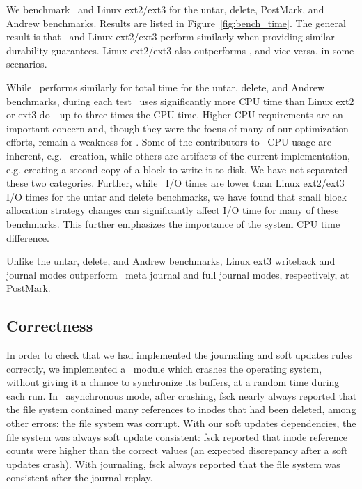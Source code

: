We benchmark \Kudos\ and Linux ext2/ext3 for the untar, delete,
PostMark, and Andrew benchmarks. Results are listed in
Figure~\ref{fig:bench_time}.
%
The general result is that \Kudos\ and Linux ext2/ext3 perform
similarly when providing similar durability guarantees. Linux
ext2/ext3 also outperforms \Kudos, and vice versa, in some scenarios.

\benchtable{}

While \Kudos\ performs similarly for total time for the untar, delete,
and Andrew benchmarks, during each test \Kudos\ uses significantly
more CPU time than Linux ext2 or ext3 do---up to three times the CPU
time.
%
Higher CPU requirements are an important concern and, though they were
the focus of many of our optimization efforts, remain a weakness
for \Kudos.
%
Some of the contributors to \Kudos\ CPU usage are inherent, e.g.
\patch\ creation, while others are artifacts of the current
implementation, e.g.  creating a second copy of a block to write it to
disk. We have not separated these two categories.
%
Further, while \Kudos\ I/O times are lower than Linux ext2/ext3 I/O
times for the untar and delete benchmarks, we have found that small
block allocation strategy changes can significantly affect I/O time
for many of these benchmarks. This further emphasizes the importance
of the system CPU time difference.

Unlike the untar, delete, and Andrew benchmarks, Linux ext3 writeback
and journal modes outperform \Kudos\ meta journal and full journal
modes, respectively, at PostMark.


\subsection {Correctness}
\label{sec:eval:correctness}

In order to check that we had implemented the journaling and soft updates
rules correctly,
we implemented a \Kudos\ module which crashes the operating system, without
giving it a chance to synchronize its buffers, at a random time during each
run.
%
In \Kudos\ asynchronous mode, after crashing, fsck nearly always reported
that the file system contained many references to inodes that had been
deleted, among other errors: the file system was corrupt.
%
With our soft updates dependencies, the file system was always soft update
consistent: fsck reported that inode reference counts were higher than the
correct values (an expected discrepancy after a soft updates crash).
%
With journaling, fsck always reported that the file system was
consistent after the journal replay.

